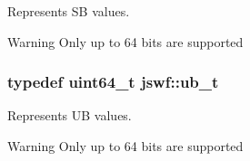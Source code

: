 Represents {\ttfamily S\+B} values. 

\begin{DoxyWarning}{Warning}
Only up to 64 bits are supported 
\end{DoxyWarning}
\hypertarget{namespacejswf_a38f034ab4371db2c8aee66e1c92b5bc7}{
\subsubsection[{ub\+\_\+t}]{\setlength{\rightskip}{0pt plus 5cm}typedef uint64\+\_\+t {\bf jswf\+::ub\+\_\+t}}}\label{namespacejswf_a38f034ab4371db2c8aee66e1c92b5bc7}


Represents {\ttfamily U\+B} values. 

\begin{DoxyWarning}{Warning}
Only up to 64 bits are supported 
\end{DoxyWarning}
